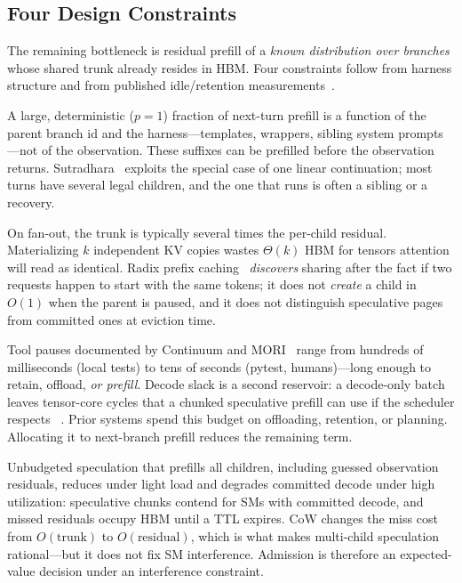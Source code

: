 \subsection{Four Design Constraints}
\label{sec:insights}
The remaining bottleneck is residual prefill of a \emph{known distribution over branches} whose shared trunk already resides in HBM.
Four constraints follow from harness structure and from published idle/retention measurements~\cite{continuum,mori,sutradhara}.

\begin{insight}
\label{ins:known}
A large, deterministic ($p{=}1$) fraction of next-turn prefill is a function of the parent branch id and the harness---templates, wrappers, sibling system prompts---not of the observation.
These suffixes can be prefilled before the observation returns.
Sutradhara~\cite{sutradhara} exploits the special case of one linear continuation; most turns have several legal children, and the one that runs is often a sibling or a recovery.
\end{insight}

\begin{insight}
\label{ins:fork}
On fan-out, the trunk is typically several times the per-child residual.
Materializing $k$ independent KV copies wastes $\Theta(k)$ HBM for tensors attention will read as identical.
Radix prefix caching~\cite{sglang} \emph{discovers} sharing after the fact if two requests happen to start with the same tokens; it does not \emph{create} a child in $O(1)$ when the parent is paused, and it does not distinguish speculative pages from committed ones at eviction time.
\end{insight}

\begin{insight}
\label{ins:idle}
Tool pauses documented by Continuum and MORI~\cite{continuum,mori} range from hundreds of milliseconds (local tests) to tens of seconds (pytest, humans)---long enough to retain, offload, \emph{or prefill}.
Decode slack is a second reservoir: a decode-only batch leaves tensor-core cycles that a chunked speculative prefill can use if the scheduler respects \tbt{}~\cite{sarathi,jitserve}.
Prior systems spend this budget on offloading, retention, or planning. Allocating it to next-branch prefill reduces the remaining \ttft{} term.
\end{insight}

\begin{insight}
\label{ins:budget}
Unbudgeted speculation that prefills all children, including guessed observation residuals, reduces \ttft{} under light load and degrades committed decode under high utilization: speculative chunks contend for SMs with committed decode, and missed residuals occupy HBM until a TTL expires.
CoW changes the miss cost from $O(\text{trunk})$ to $O(\text{residual})$, which is what makes multi-child speculation rational---but it does not fix SM interference.
Admission is therefore an expected-value decision under an interference constraint.
\end{insight}

